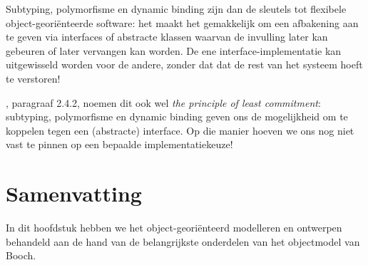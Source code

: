 Subtyping, polymorfisme en dynamic binding zijn dan de sleutels 
tot flexibele object-georiënteerde software: het maakt het gemakkelijk 
om een afbakening aan te geven via interfaces of abstracte klassen 
waarvan de invulling later kan gebeuren of later vervangen kan worden.
De ene interface-implementatie kan uitgewisseld worden voor de andere,
zonder dat dat de rest van het systeem hoeft te verstoren!

\cite{Abelson1996}, paragraaf 2.4.2, noemen dit ook wel \textit{the principle of least commitment}:
subtyping, polymorfisme en dynamic binding geven ons de mogelijkheid om te koppelen tegen een (abstracte)
interface. Op die manier hoeven we ons nog niet vast te pinnen op een bepaalde implementatiekeuze!

\section{Samenvatting}
In dit hoofdstuk hebben we het object-georiënteerd modelleren en ontwerpen 
behandeld aan de hand van de belangrijkste onderdelen van het objectmodel van Booch.

